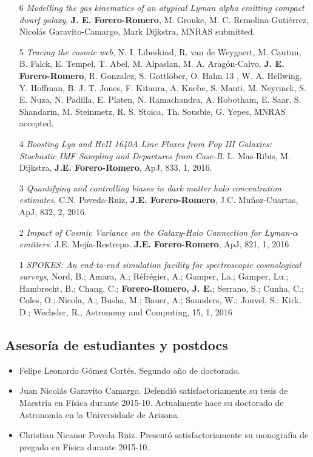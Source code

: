 \documentclass{article}
\begin{document}
\begin{itemize}

\item[6]{\it Modelling the gas kinematics of an atypical Lyman alpha
emitting compact dwarf galaxy}, {\bf J. E. Forero-Romero}, M. Gronke, M. C. Remolina-Guti\'errez,
Nicol\'as Garavito-Camargo, Mark Dijkstra, MNRAS submitted. 

\item[5]{\it Tracing the cosmic web}, N. I. Libeskind, R. van de Weygaert, M. Cautun, B. Falck, E.
Tempel, T. Abel, M. Alpaslan, M. A. Aragón-Calvo, {\bf
  J. E. Forero-Romero},  R. Gonzalez, S. Gottl\"ober, O. Hahn 13 ,
W. A. Hellwing, Y. Hoffman, B. J. T. Jones, F. Kitaura, A. Knebe,
S. Manti, M. Neyrinck, S. E. Nuza, N. Padilla, E. Platen,
N. Ramachandra, A. Robotham, E. Saar, S. Shandarin, M. Steinmetz,
R. S. Stoica, Th. Sousbie, G. Yepes, MNRAS accepted.  

\item[4]{\it Boosting Lya and HeII 1640A Line Fluxes from Pop III
  Galaxies: Stochastic IMF Sampling and Departures from
  Case-B}. L. Mas-Ribis, M. Dijkstra, {\bf J.E. Forero-Romero},
  ApJ, 833, 1, 2016.

\item[3]{\it Quantifying and controlling biases in dark matter halo
  concentration estimates}, C.N. Poveda-Ruiz, {\bf
  J.E. Forero-Romero}, J.C. Mu\~noz-Cuartas, ApJ, 832, 2, 2016. 

\item[2]{\it Impact of Cosmic Variance on the Galaxy-Halo Connection
  for Lyman-$\alpha$ emitters}.  J.E. Mej\'ia-Restrepo, {\bf
  J.E. Forero-Romero}, ApJ, 821, 1, 2016

\item[1]{\it SPOKES: An end-to-end simulation facility for
  spectroscopic cosmological surveys}, 
	Nord, B.; Amara, A.; R\'efr\'egier, A.; Gamper, La.; Gamper, Lu.;
        Hambrecht, B.; Chang, C.; {\bf Forero-Romero, J. E.}; Serrano, S.;
        Cunha, C.; Coles, O.; Nicola, A.; Busha, M.; Bauer, A.;
        Saunders, W.; Jouvel, S.; Kirk, D.; Wechsler, R., Astronomy
        and Computing, 15, 1, 2016
\end{itemize}

\subsection{Asesor\'ia de estudiantes y postdocs}

\begin{itemize}
\item{Felipe Leonardo G\'omez Cort\'es. Segundo a\~no de doctorado.}
\item{Juan Nicol\'as Garavito Camargo. Defendi\'o satisfactoriamente
  su tesis de Maestr\'ia en F\'isica durante 2015-10. Actualmente hace su doctorado de
  Astronom\'ia en la Universidade de Arizona.}
\item{Christian Nicanor Poveda Ruiz. Present\'o satisfactoriamente su
  monograf\'ia de pregado en F\'isica durante 2015-10.}
\end{itemize}
\end{document}
